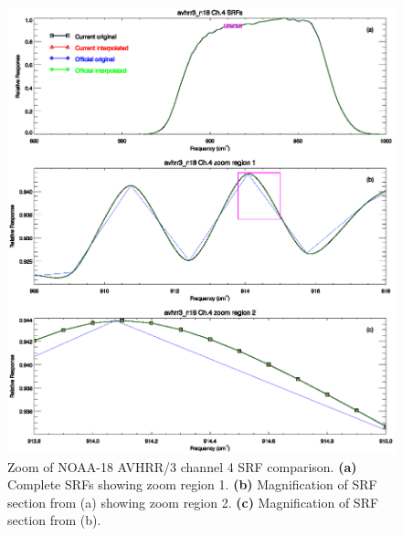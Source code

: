 \begin{figure}[htp]
  \centering
  \includegraphics[scale=1]{graphics/zoom/avhrr3_n18.ch4.srf.zoom.eps}
  \caption{Zoom of NOAA-18 AVHRR/3 channel 4 SRF comparison. \textbf{(a)} Complete SRFs showing zoom region 1. \textbf{(b)} Magnification of SRF section from (a) showing zoom region 2.  \textbf{(c)} Magnification of SRF section from (b).}
  \label{fig:avhrr3_n18.ch4.srf.zoom}
\end{figure}


